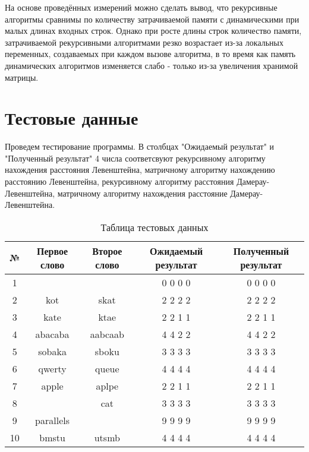 \documentclass[12pt]{report}
\begin{document}
\par
На основе проведённых измерений можно сделать вывод, что рекурсивные алгоритмы сравнимы по количеству затрачиваемой памяти с динамическими при малых длинах входных строк. Однако при росте длины строк количество памяти, затрачиваемой рекурсивными алгоритмами резко возрастает из-за локальных переменных, создаваемых при каждом вызове алгоритма, в то время как память динамических алгоритмов изменяется слабо - только из-за увеличения хранимой матрицы.




\section{Тестовые данные}

\par
Проведем тестирование программы. В столбцах "Ожидаемый результат" и "Полученный результат" 4 числа соответсвуют рекурсивному алгоритму нахождения расстояния Левенштейна, матричному алгоритму нахождению расстоянию Левенштейна, рекурсивному алгоритму расстояния Дамерау-Левенштейна, матричному алгоритму нахождения расстояние Дамерау-Левенштейна.

\begin{table} [H]
\caption{Таблица тестовых данных}
	\begin{tabular}{|c c c c c|} 
 	\hline
	№ & Первое слово & Второе слово & Ожидаемый результат & Полученный результат \\ [0.8ex] 
 	\hline\hline
 	1 &  &  & 0 0 0 0 & 0 0 0 0\\
 	\hline
 	2 & kot & skat & 2 2 2 2 & 2 2 2 2\\
 	\hline
	3 & kate & ktae & 2 2 1 1 & 2 2 1 1\\
	\hline
	4 & abacaba & aabcaab & 4 4 2 2 & 4 4 2 2\\
	\hline
	5 & sobaka & sboku & 3 3 3 3 & 3 3 3 3\\
	\hline
	6 & qwerty & queue & 4 4 4 4 & 4 4 4 4\\
	\hline
	7 & apple & aplpe & 2 2 1 1  & 2 2 1 1\\
	\hline
	8 &  & cat & 3 3 3 3 & 3 3 3 3\\
	\hline
	9 & parallels &  & 9 9 9 9 & 9 9 9 9\\
	\hline
	10 & bmstu & utsmb & 4 4 4 4 & 4 4 4 4\\
	\hline
	\end{tabular}
\end{table}
\end{document}
